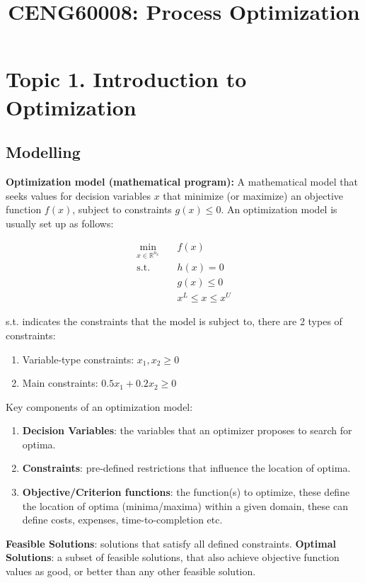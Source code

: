 \documentclass{article}
\title{CENG60008: Process Optimization}
\begin{document}
\maketitle

\section{Topic 1. Introduction to Optimization}

\subsection{Modelling}

\textbf{Optimization model (mathematical program):} A mathematical model that seeks values for decision variables \(x\) that minimize (or maximize) an objective function \(f(x)\), subject to constraints \(g(x) \le 0\). An optimization model is usually set up as follows:

\begin{align*}
\min_{x \in \mathbb{R}^{n_x}} \quad & f(x) \\
\text{s.t.} \quad & h(x) = 0 \\
& g(x) \leq 0 \\
& x^L \leq x \leq x^U
\end{align*}

s.t. indicates the constraints that the model is subject to, there are 2 types of constraints:

\begin{enumerate}
    \item Variable-type constraints: \(x_1, x_2 \geq 0\)
    \item Main constraints: \(0.5x_1 + 0.2x_2 \geq 0\)
\end{enumerate}

Key components of an optimization model:
\begin{enumerate}
    \item \textbf{Decision Variables}: the variables that an optimizer proposes to search for optima.
    \item \textbf{Constraints}: pre-defined restrictions that influence the location of optima.
    \item \textbf{Objective/Criterion functions}: the function(s) to optimize, these define the location of optima (minima/maxima) within a given domain, these can define costs, expenses, time-to-completion etc.
\end{enumerate}

\textbf{Feasible Solutions}: solutions that satisfy all defined constraints.
\textbf{Optimal Solutions}: a subset of feasible solutions, that also achieve objective function values as good, or better than any other feasible solution.
\end{document}
